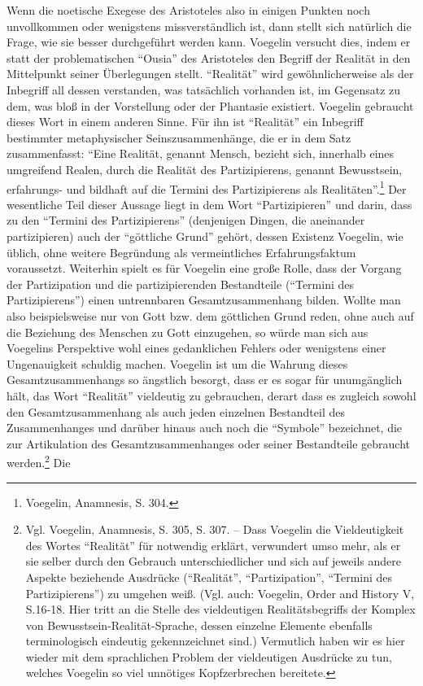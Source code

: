 Wenn die noetische Exegese des Aristoteles also in einigen Punkten noch
unvollkommen oder wenigstens missverständlich ist, dann stellt sich natürlich
die Frage, wie sie besser durchgeführt werden kann. Voegelin versucht dies,
indem er statt der problematischen "`Ousia"' des Aristoteles den Begriff der
Realität in den Mittelpunkt seiner Überlegungen stellt. "`Realität"' wird
gewöhnlicherweise als der Inbegriff all dessen verstanden, was tatsächlich
vorhanden ist, im Gegensatz zu dem, was bloß in der Vorstellung oder der
Phantasie existiert.  Voegelin gebraucht dieses Wort in einem anderen Sinne.
Für ihn ist "`Realität"' ein Inbegriff bestimmter metaphysischer
Seinszusammenhänge, die er in dem Satz zusammenfasst: "`Eine Realität, genannt
Mensch, bezieht sich, innerhalb eines umgreifend Realen, durch die Realität
des Partizipierens, genannt Bewusstsein, erfahrungs- und bildhaft auf die
Termini des Partizipierens als Realitäten"'.\footnote{Voegelin, Anamnesis, S.
  304.} Der wesentliche Teil dieser Aussage liegt in dem Wort
"`Partizipieren"' und darin, dass zu den "`Termini des Partizipierens"'
(denjenigen Dingen, die aneinander partizipieren) auch der "`göttliche Grund"'
gehört, dessen Existenz Voegelin, wie üblich, ohne weitere Begründung als
vermeintliches Erfahrungsfaktum voraussetzt. Weiterhin spielt es für Voegelin
eine große Rolle, dass der Vorgang der Partizipation und die partizipierenden
Bestandteile ("`Termini des Partizipierens"') einen untrennbaren
Gesamtzusammenhang bilden. Wollte man also beispielsweise nur von Gott bzw.
dem göttlichen Grund reden, ohne auch auf die Beziehung des Menschen zu Gott
einzugehen, so würde man sich aus Voegelins Perspektive wohl eines
gedanklichen Fehlers oder wenigstens einer Ungenauigkeit schuldig machen.
Voegelin ist um die Wahrung dieses Gesamtzusammenhangs so ängstlich besorgt,
dass er es sogar für unumgänglich hält, das Wort "`Realität"' vieldeutig zu
gebrauchen, derart dass es zugleich sowohl den Gesamtzusammenhang als auch
jeden einzelnen Bestandteil des Zusammenhanges und darüber hinaus auch noch
die "`Symbole"' bezeichnet, die zur Artikulation des Gesamtzusammenhanges oder
seiner Bestandteile gebraucht werden.\footnote{Vgl.  Voegelin, Anamnesis, S.
  305, S. 307. -- Dass Voegelin die Vieldeutigkeit des Wortes "`Realität"' für
  notwendig erklärt, verwundert umso mehr, als er sie selber durch den
  Gebrauch unterschiedlicher und sich auf jeweils andere Aspekte beziehende
  Ausdrücke ("`Realität"', "`Partizipation"', "`Termini des Partizipierens"')
  zu umgehen weiß. (Vgl. auch: Voegelin, Order and History V, S.16-18. Hier
  tritt an die Stelle des vieldeutigen Realitätsbegriffs der Komplex von
  Bewusstsein-Realität-Sprache, dessen einzelne Elemente ebenfalls
  terminologisch eindeutig gekennzeichnet sind.)  Vermutlich haben wir es hier
  wieder mit dem sprachlichen Problem der vieldeutigen Ausdrücke zu tun,
  welches Voegelin so viel unnötiges Kopfzerbrechen bereitete.} Die
